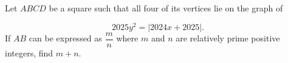 Let $ABCD$ be a square such that all four of its vertices lie on the graph of

$$2025y^2=|2024x+2025|.$$If $AB$ can be expressed as $\dfrac{m}{n}$ where $m$ and $n$ are relatively prime positive integers, find $m+n$.
